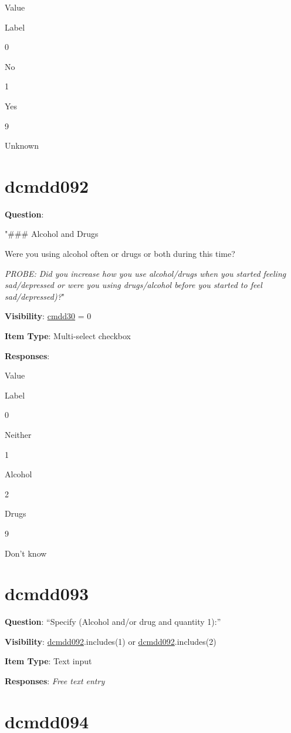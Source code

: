 \documentclass[
]{book}
\begin{document}
Value

Label

0

No

1

Yes

9

Unknown

\hypertarget{dcmdd092}{%
\section{dcmdd092}\label{dcmdd092}}

\textbf{Question}:

"\#\#\# Alcohol and Drugs

Were you using alcohol often or drugs or both during this time?

\emph{PROBE: Did you increase how you use alcohol/drugs when you started feeling sad/depressed or were you using drugs/alcohol before you started to feel sad/depressed)?}"

\textbf{Visibility}: \protect\hyperlink{cmdd30}{cmdd30} = 0

\textbf{Item Type}: Multi-select checkbox

\textbf{Responses}:

Value

Label

0

Neither

1

Alcohol

2

Drugs

9

Don't know

\hypertarget{dcmdd093}{%
\section{dcmdd093}\label{dcmdd093}}

\textbf{Question}: ``Specify (Alcohol and/or drug and quantity 1):''

\textbf{Visibility}: \protect\hyperlink{dcmdd092}{dcmdd092}.includes(1) or \protect\hyperlink{dcmdd092}{dcmdd092}.includes(2)

\textbf{Item Type}: Text input

\textbf{Responses}: \emph{Free text entry}

\hypertarget{dcmdd094}{%
\section{dcmdd094}\label{dcmdd094}}
\end{document}

